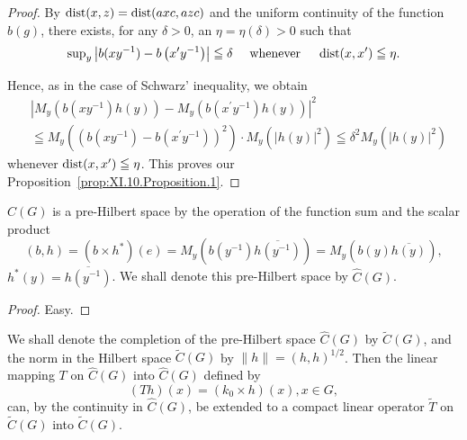 \begin{proof}
 By $\operatorname{dist}(x,z)=\operatorname{dist}(axc,azc)$ and the uniform continuity of the function $b(g)$, there exists, for any $\delta>0$, an $\eta=\eta(\delta)>0$ such that 
\[
\sup\nolimits _{y} \left| b (x y ^{-1}) - b \left(x ^{\prime} y ^{-1}\right) \right| \leqq \delta \quad \text{ whenever } \quad \operatorname{dist} (x, x ^{\prime}) \leqq \eta . \]

Hence, as in the case of Schwarz' inequality, we obtain 
\begin{equation}\label{eq:XI.10.8}
\begin{aligned}
& \left| M _{y} (b (x y ^{-1}) h (y)) - M _{y} (b (x ^{\prime} y ^{-1}) h (y)) \right| ^{2}
\\
&\leqq M _{y} ((b (x y ^{-1}) - b (x ^{\prime} y ^{-1})) ^{2}) \cdot M _{y} (| h (y) | ^{2}) \leqq \delta^{2} M _{y} (| h (y) | ^{2})
\end{aligned}
\end{equation}
whenever $\operatorname{dist}(x, x') \leqq \eta$. This proves our Proposition~\ref{prop:XI.10.Proposition.1}. 
\end{proof}

\begin{proposition}\label{prop:XI.10.Proposition.2} $C(G)$ is a pre-Hilbert space by the operation of the function sum and the scalar product 
\begin{equation}\label{eq:XI.10.9}
(b, h) = (b \times h ^{*}) (e) = M _{y} (b (y ^{-1}) \overline {{h (y ^{-1})}}) = M _{y} (b (y) \overline {{h (y)}}),
\end{equation}
$h^{*}(y) = \overline{h(y^{-1})}$. We shall denote this pre-Hilbert space by $\hat{C}(G)$. 
\end{proposition}

\begin{proof}
 Easy. 
\end{proof}

\begin{proposition}\label{prop:XI.10.Proposition.3} We shall denote the completion of the pre-Hilbert space $\hat{C}(G)$ by $\tilde{C}(G)$, and the norm in the Hilbert space $\tilde{C}(G)$ by $\|h\| = (h, h)^{1/2}$. Then the linear mapping $T$ on $\hat{C}(G)$ into $\hat{C}(G)$ defined by 
\begin{equation}\label{eq:XI.10.10}
(T h) (x) = \left(k _{0} \times h\right) (x), x \in G,
\end{equation}
can, by the continuity in $\hat{C}(G)$, be extended to a compact linear operator $\tilde{T}$ on $\tilde{C}(G)$ into $\tilde{C}(G)$. 
\end{proposition}

